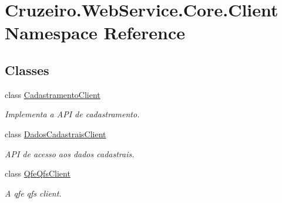 \hypertarget{namespace_cruzeiro_1_1_web_service_1_1_core_1_1_client}{}\section{Cruzeiro.\+Web\+Service.\+Core.\+Client Namespace Reference}
\label{namespace_cruzeiro_1_1_web_service_1_1_core_1_1_client}
\subsection*{Classes}
\begin{DoxyCompactItemize}
\item 
class \hyperlink{class_cruzeiro_1_1_web_service_1_1_core_1_1_client_1_1_cadastramento_client}{Cadastramento\+Client}
\begin{DoxyCompactList}\small\item\em Implementa a A\+PI de cadastramento. \end{DoxyCompactList}\item 
class \hyperlink{class_cruzeiro_1_1_web_service_1_1_core_1_1_client_1_1_dados_cadastrais_client}{Dados\+Cadastrais\+Client}
\begin{DoxyCompactList}\small\item\em A\+PI de acesso aos dados cadastrais. \end{DoxyCompactList}\item 
class \hyperlink{class_cruzeiro_1_1_web_service_1_1_core_1_1_client_1_1_qfe_qfs_client}{Qfe\+Qfs\+Client}
\begin{DoxyCompactList}\small\item\em A qfe qfs client. \end{DoxyCompactList}\end{DoxyCompactItemize}
